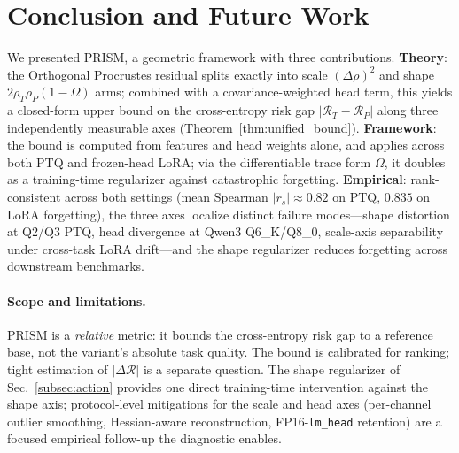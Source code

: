 \documentclass{article}
\begin{document}
\section{Conclusion and Future Work}
\label{sec:conclusion}

We presented PRISM, a geometric framework with three contributions. \textbf{Theory}: the Orthogonal Procrustes residual splits exactly into scale $(\Delta\rho)^2$ and shape $2\rho_T\rho_P(1{-}\Omega)$ arms; combined with a covariance-weighted head term, this yields a closed-form upper bound on the cross-entropy risk gap $|\mathcal{R}_T - \mathcal{R}_P|$ along three independently measurable axes (Theorem~\ref{thm:unified_bound}). \textbf{Framework}: the bound is computed from features and head weights alone, and applies across both PTQ and frozen-head LoRA; via the differentiable trace form $\Omega$, it doubles as a training-time regularizer against catastrophic forgetting. \textbf{Empirical}: rank-consistent across both settings (mean Spearman $|r_s|{\approx}0.82$ on PTQ, $0.835$ on LoRA forgetting), the three axes localize distinct failure modes---shape distortion at Q2/Q3 PTQ, head divergence at Qwen3 Q6\_K/Q8\_0, scale-axis separability under cross-task LoRA drift---and the shape regularizer reduces forgetting across downstream benchmarks.

\paragraph{Scope and limitations.}
PRISM is a \emph{relative} metric: it bounds the cross-entropy risk gap to a reference base, not the variant's absolute task quality. The bound is calibrated for ranking; tight estimation of $|\Delta\mathcal{R}|$ is a separate question. The shape regularizer of Sec.~\ref{subsec:action} provides one direct training-time intervention against the shape axis; protocol-level mitigations for the scale and head axes (per-channel outlier smoothing, Hessian-aware reconstruction, FP16-\texttt{lm\_head} retention) are a focused empirical follow-up the diagnostic enables.
\end{document}
